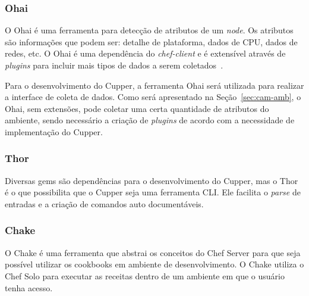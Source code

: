 \subsubsection{Ohai}
\label{sec:deps:ohai}

O Ohai é uma ferramenta para detecção de atributos de um \textit{node}. Os atributos são
informações que podem ser: detalhe de plataforma, dados de CPU, dados de redes, etc.
O Ohai é uma dependência do \textit{chef-client} e é extensível através de \textit{plugins}
para incluir mais tipos de dados a serem coletados~\cite{ohaidoc:2016}.

Para o desenvolvimento do Cupper, a ferramenta Ohai será utilizada para realizar a
interface de coleta de dados. Como será apresentado na Seção~\ref{sec:cam-amb}, o
Ohai, sem extensões, pode coletar uma certa quantidade de atributos do ambiente, sendo
necessário a criação de \textit{plugins} de acordo com a necessidade de implementação do Cupper.

\subsubsection{Thor}
\label{sec:deps:thor}

Diversas gems são dependências para o desenvolvimento do Cupper, mas o Thor
é o que possibilita que o Cupper seja uma ferramenta CLI\@. Ele facilita o
\textit{parse} de entradas e a criação de comandos auto documentáveis.

\subsubsection{Chake}
\label{sec:deps:chake}

O Chake é uma ferramenta que abstrai os conceitos do Chef Server para que
seja possível utilizar os cookbooks em ambiente de desenvolvimento. O Chake utiliza o
Chef Solo para executar as receitas dentro de um ambiente em que o usuário
tenha acesso.
